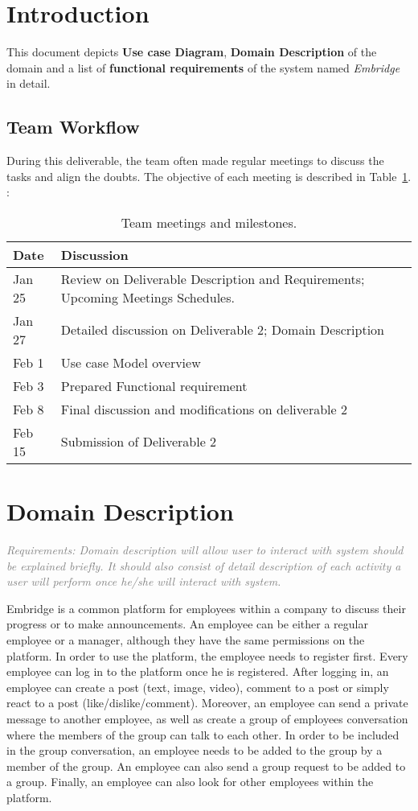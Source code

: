 \documentclass[12pt,a4paper]{article}
\newcommand{\reqs}[2][gray]{\textit{\textcolor{#1}{Requirements: #2}}}
\begin{document}
\section*{Introduction}

This document depicts \textbf{Use case Diagram}, \textbf{Domain Description} of the domain and a list of \textbf{functional requirements} of the system named \textit{Embridge} in detail.

\subsection*{Team Workflow}

During this deliverable, the team often made regular meetings to discuss the tasks and align the doubts. The objective of each meeting is described in Table~\ref{tab:meeting}. : 

\begin{table}[h]
\centering
\caption{Team meetings and milestones.}
\label{tab:meeting}
\begin{tabularx}{\textwidth}{@{}lX@{}}
\toprule
Date & Discussion \\ \midrule
Jan 25 & Review on Deliverable Description and Requirements; Upcoming Meetings Schedules. \\
Jan 27 & Detailed discussion on Deliverable 2; Domain Description\\
Feb 1 & Use case Model overview \\
Feb 3 &  Prepared Functional requirement \\
Feb 8 &  Final discussion and modifications on deliverable 2  \\
Feb 15 & Submission of Deliverable 2 \\
\bottomrule
\end{tabularx}
\end{table}
\section{Domain Description} \label{gqm}

\reqs{
Domain description will allow user to interact
with system should be explained briefly. It should also consist of detail description of each activity a user will perform once he/she will interact with system.
}

Embridge is a common platform for employees within a company to discuss their progress or to make announcements. An employee can be either a regular employee or a manager, although they have the same permissions on the platform. In order to use the platform, the employee needs to register first. Every employee can log in to the platform once he is registered. After logging in, an employee can create a post (text, image, video), comment to a post or simply react to a post (like/dislike/comment). Moreover, an employee can send a private message to another employee, as well as create a group of employees conversation where the members of the group can talk to each other. In order to be included in the group conversation, an employee needs to be added to the group by a member of the group. An employee can also send a group request to be added to a group. Finally, an employee can also look for other employees within the platform.
\end{document}
